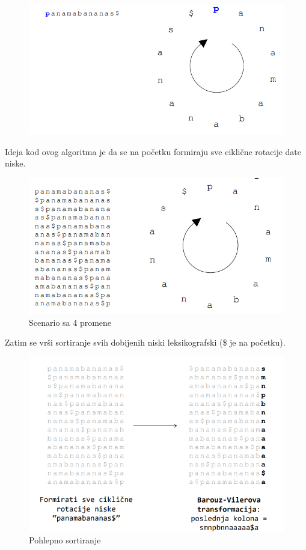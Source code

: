 \begin{figure}[h!]
\centering
\includegraphics[scale=0.6]{poglavlja/9/slike/BWT.png}
\caption{}
\label{slika:X}
\end{figure}

\newpage

Ideja kod ovog algoritma je da se na početku formiraju sve ciklične rotacije date niske.

\begin{figure}[h!]
\centering
\includegraphics[scale=0.7]{poglavlja/9/slike/SveCiklicneRotacije.png}
\caption{Scenario sa 4 promene}
\label{slika:X}
\end{figure}

Zatim se vrši sortiranje svih dobijenih niski leksikografski (\$ je na početku).

\begin{figure}[h!]
\centering
\includegraphics[scale=0.4]{poglavlja/9/slike/BWTPoslednjaKolona.png}
\caption{Pohlepno sortiranje}
\label{slika:X}
\end{figure}

